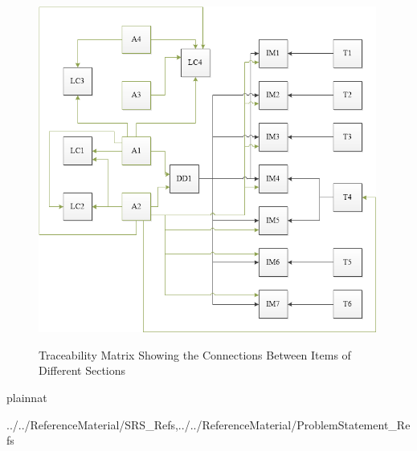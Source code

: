 \documentclass[12pt]{article}
\begin{document}
 \begin{figure}[h!]
 	\begin{center}
 		{
 			\includegraphics[width=0.99\textwidth]{figures/ATrace.png}
 		}
 		\caption{\label{Fig_ATrace} Traceability Matrix Showing the Connections 
 		Between Items of Different Sections}
 	\end{center}
 \end{figure}



\newpage

 {plainnat}
 
{../../ReferenceMaterial/SRS_Refs,../../ReferenceMaterial/ProblemStatement_Refs}

%
%
%
%
\end{document}
